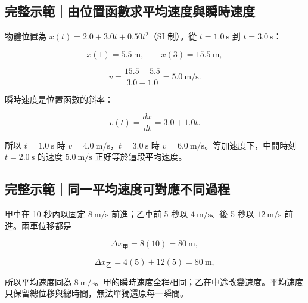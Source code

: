 \documentclass[11pt,a4paper]{article}
\begin{document}
\begin{HandoutWorkedExample}

\subsection{完整示範｜由位置函數求平均速度與瞬時速度}\label{ux5b8cux6574ux793aux7bc4ux7531ux4f4dux7f6eux51fdux6578ux6c42ux5e73ux5747ux901fux5ea6ux8207ux77acux6642ux901fux5ea6}

物體位置為 \(x(t)=2.0+3.0t+0.50t^2\)（SI 制）。從 \(t=1.0\ \mathrm s\) 到 \(t=3.0\ \mathrm s\)：

\[
x(1)=5.5\ \mathrm m,\qquad x(3)=15.5\ \mathrm m,
\]

\[
\bar v=\frac{15.5-5.5}{3.0-1.0}=5.0\ \mathrm{m/s}.
\]

瞬時速度是位置函數的斜率：

\[
v(t)=\frac{dx}{dt}=3.0+1.0t.
\]

所以 \(t=1.0\ \mathrm s\) 時 \(v=4.0\ \mathrm{m/s}\)，\(t=3.0\ \mathrm s\) 時 \(v=6.0\ \mathrm{m/s}\)。等加速度下，中間時刻 \(t=2.0\ \mathrm s\) 的速度 \(5.0\ \mathrm{m/s}\) 正好等於這段平均速度。

\end{HandoutWorkedExample}

\begin{HandoutWorkedExample}

\subsection{完整示範｜同一平均速度可對應不同過程}\label{ux5b8cux6574ux793aux7bc4ux540cux4e00ux5e73ux5747ux901fux5ea6ux53efux5c0dux61c9ux4e0dux540cux904eux7a0b}

甲車在 10 秒內以固定 \(8\ \mathrm{m/s}\) 前進；乙車前 5 秒以 \(4\ \mathrm{m/s}\)、後 5 秒以 \(12\ \mathrm{m/s}\) 前進。兩車位移都是

\[
\Delta x_\text{甲}=8(10)=80\ \mathrm m,
\]

\[
\Delta x_\text{乙}=4(5)+12(5)=80\ \mathrm m,
\]

所以平均速度同為 \(8\ \mathrm{m/s}\)。甲的瞬時速度全程相同；乙在中途改變速度。平均速度只保留總位移與總時間，無法單獨還原每一瞬間。

\end{HandoutWorkedExample}
\end{document}
